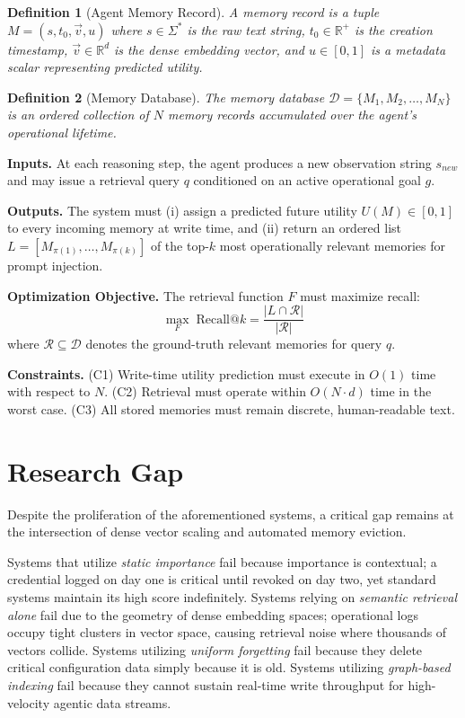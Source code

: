 \documentclass[conference]{IEEEtran}
\newtheorem{definition}{Definition}
\begin{document}
\begin{definition}[Agent Memory Record]
A memory record is a tuple $M = (s, t_0, \vec{v}, u)$ where $s \in \Sigma^*$ is the raw text string, $t_0 \in \mathbb{R}^+$ is the creation timestamp, $\vec{v} \in \mathbb{R}^d$ is the dense embedding vector, and $u \in [0,1]$ is a metadata scalar representing predicted utility.
\end{definition}

\begin{definition}[Memory Database]
The memory database $\mathcal{D} = \{M_1, M_2, \ldots, M_N\}$ is an ordered collection of $N$ memory records accumulated over the agent's operational lifetime.
\end{definition}

\textbf{Inputs.} At each reasoning step, the agent produces a new observation string $s_{new}$ and may issue a retrieval query $q$ conditioned on an active operational goal $g$.

\textbf{Outputs.} The system must (i) assign a predicted future utility $U(M) \in [0,1]$ to every incoming memory at write time, and (ii) return an ordered list $L = [M_{\pi(1)}, \ldots, M_{\pi(k)}]$ of the top-$k$ most operationally relevant memories for prompt injection.

\textbf{Optimization Objective.} The retrieval function $F$ must maximize recall:
\begin{equation}
\label{eq:objective}
\max_{F} \; \text{Recall@}k = \frac{|L \cap \mathcal{R}|}{|\mathcal{R}|}
\end{equation}
where $\mathcal{R} \subseteq \mathcal{D}$ denotes the ground-truth relevant memories for query $q$.

\textbf{Constraints.} (C1) Write-time utility prediction must execute in $O(1)$ time with respect to $N$. (C2) Retrieval must operate within $O(N \cdot d)$ time in the worst case. (C3) All stored memories must remain discrete, human-readable text.

\section{Research Gap}
\label{sec:gap}
Despite the proliferation of the aforementioned systems, a critical gap remains at the intersection of dense vector scaling and automated memory eviction.

Systems that utilize \textit{static importance} fail because importance is contextual; a credential logged on day one is critical until revoked on day two, yet standard systems maintain its high score indefinitely. Systems relying on \textit{semantic retrieval alone} fail due to the geometry of dense embedding spaces; operational logs occupy tight clusters in vector space, causing retrieval noise where thousands of vectors collide. Systems utilizing \textit{uniform forgetting} fail because they delete critical configuration data simply because it is old. Systems utilizing \textit{graph-based indexing} fail because they cannot sustain real-time write throughput for high-velocity agentic data streams.
\end{document}
